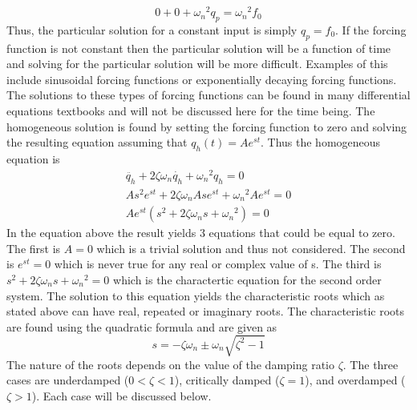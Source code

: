 \begin{equation}
    0 + 0 + {\omega_n}^2 q_p = {\omega_n}^2 f_0
\end{equation}
Thus, the particular solution for a constant input is simply $q_p = f_0$. If the forcing function is not constant then the particular solution will be a function of time and solving for the particular solution will be more difficult. Examples of this include sinusoidal forcing functions or exponentially decaying forcing functions. The solutions to these types of forcing functions can be found in many differential equations textbooks and will not be discussed here for the time being. The homogeneous solution is found by setting the forcing function to zero and solving the resulting equation assuming that $q_h(t)=Ae^{st}$. Thus the homogeneous equation is
\begin{equation}
    \begin{matrix}
    \ddot{q_h} + 2\zeta \omega_n \dot{q_h} + {\omega_n}^2 q_h = 0 \\
    A s^2 e^{st} + 2\zeta \omega_n A s e^{st} + {\omega_n}^2 A e^{st} = 0 \\
    Ae^{st}(s^2 + 2\zeta \omega_n s + {\omega_n}^2) = 0
    \end{matrix}
\end{equation}
In the equation above the result yields 3 equations that could be equal to zero. The first is $A=0$ which is a trivial solution and thus not considered. The second is $e^{st}=0$ which is never true for any real or complex value of s. The third is $s^2 + 2\zeta \omega_n s + {\omega_n}^2 = 0$ which is the charactertic equation for the second order system. The solution to this equation yields the characteristic roots which as stated above can have real, repeated or imaginary roots. The characteristic roots are found using the quadratic formula and are given as
\begin{equation}
    s = -\zeta \omega_n \pm \omega_n \sqrt{\zeta^2 - 1}
\end{equation}
The nature of the roots depends on the value of the damping ratio $\zeta$. The three cases are underdamped ($0<\zeta<1$), critically damped ($\zeta=1$), and overdamped ($\zeta>1$). Each case will be discussed below.
